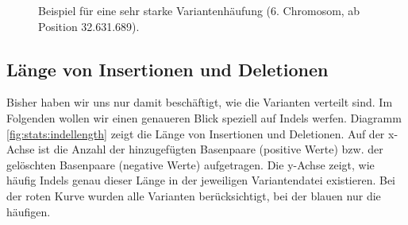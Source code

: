 \begin{figure}[hp]
\pgfplotsset{footnotesize,width=14cm,height=8cm,compat=1.8}
\begin{center}
\end{center}
\caption{Beispiel für eine sehr starke Variantenhäufung (6. Chromosom, ab Position 32.631.689).}
\label{fig:stats:examplewindow}
\end{figure}


\subsection{Länge von Insertionen und Deletionen}
\label{sec:stats:res:indellength}

Bisher haben wir uns nur damit beschäftigt, wie die Varianten verteilt sind. Im Folgenden wollen wir einen genaueren Blick speziell auf Indels werfen. Diagramm \ref{fig:stats:indellength} zeigt die Länge von Insertionen und Deletionen. Auf der x-Achse ist die Anzahl der hinzugefügten Basenpaare (positive Werte) bzw. der gelöschten Basenpaare (negative Werte) aufgetragen. Die y-Achse zeigt, wie häufig Indels genau dieser Länge in der jeweiligen Variantendatei existieren. Bei der roten Kurve wurden alle Varianten berücksichtigt, bei der blauen nur die häufigen.

